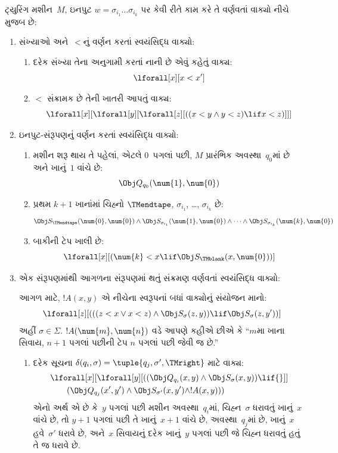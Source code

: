 ટ્યુરિંગ મશીન~$M$, ઇનપુટ
$w = \sigma_{i_1}\dots\sigma_{i_k}$ પર કેવી રીતે
કામ કરે તે વર્ણવતાં વાક્યો નીચે મુજબ છે:
\begin{enumerate}
\item સંખ્યાઓ અને~$<$નું વર્ણન કરતાં સ્વયંસિદ્ધ વાક્યો:
\begin{enumerate}
\item દરેક સંખ્યા તેના અનુગામી કરતાં નાની છે એવું
કહેતું વાક્ય:
\[
\lforall[x][x < x']
\]
\item $<$ સંક્રામક છે તેની ખાતરી આપતું વાક્ય:
\[
\lforall[x][\lforall[y][\lforall[z][
      ((x < y \land y < z) \lif x < z)]]]
\]
\end{enumerate}
\item ઇનપુટ-સંરૂપણનું વર્ણન કરતાં સ્વયંસિદ્ધ વાક્યો:
\begin{enumerate}
\item મશીન શરૂ થાય તે પહેલાં, એટલે $0$~પગલાં પછી,
  $M$ પ્રારંભિક અવસ્થા~$q_0$માં છે અને ખાનું~$1$
  વાંચે છે:
\[
\Obj Q_{q_0}(\num{1}, \num{0})
\]
\item પ્રથમ $k+1$ ખાનાંમાં ચિહ્નો $\TMendtape$,
  $\sigma_{i_1}$, \dots, $\sigma_{i_k}$ છે:
\[
\Obj S_\TMendtape(\num{0}, \num{0}) \land
\Obj S_{\sigma_{i_1}}(\num{1}, \num{0}) \land
\dots \land
\Obj S_{\sigma_{i_k}}(\num{k}, \num{0})
\]
\item બાકીની ટેપ ખાલી છે:
\[
\lforall[x][(\num{k} < x \lif \Obj S_\TMblank(x, \num{0}))]
\]
\end{enumerate}
\item એક સંરૂપણમાંથી આગળના સંરૂપણમાં થતું સંક્રમણ
  વર્ણવતાં સ્વયંસિદ્ધ વાક્યો:

આગળ માટે, $!A(x, y)$ એ નીચેના સ્વરૂપનાં બધાં
વાક્યોનું સંયોજન માનો:
\[
\lforall[z][
  (((z < x \lor x < z) \land \Obj S_\sigma(z, y))
  \lif \Obj S_\sigma(z, y'))]
\]
અહીં $\sigma \in \Sigma$. $!A(\num{m},\num{n})$
વડે આપણે કહીએ છીએ કે ``$m$મા ખાના સિવાય,
$n+1$ પગલાં પછીની ટેપ $n$ પગલાં પછી જેવી જ છે.''
\begin{enumerate}
\item {} દરેક સૂચના
  $\delta(q_i, \sigma) =
  \tuple{q_j, \sigma', \TMright}$ માટે વાક્ય:
\begin{align*}
& \lforall[x][\lforall[y][(
   (\Obj Q_{q_i}(x, y) \land \Obj S_{\sigma}(x, y)) \lif {}]] \\
&\qquad   (\Obj Q_{q_j}(x', y') \land \Obj S_{\sigma'}(x, y') \land
!A(x, y)))
\end{align*}
એનો અર્થ એ છે કે~$y$ પગલાં પછી મશીન
અવસ્થા~$q_i$માં, ચિહ્ન~$\sigma$ ધરાવતું ખાનું~$x$
વાંચે છે, તો $y+1$ પગલાં પછી તે ખાનું~$x+1$ વાંચે છે,
અવસ્થા~$q_j$માં છે, ખાનું~$x$ હવે~$\sigma'$ ધરાવે છે,
અને~$x$ સિવાયનું દરેક ખાનું~$y$ પગલાં પછી જે ચિહ્ન
ધરાવતું હતું તે જ ધરાવે છે.


\end{enumerate}
\end{enumerate}
